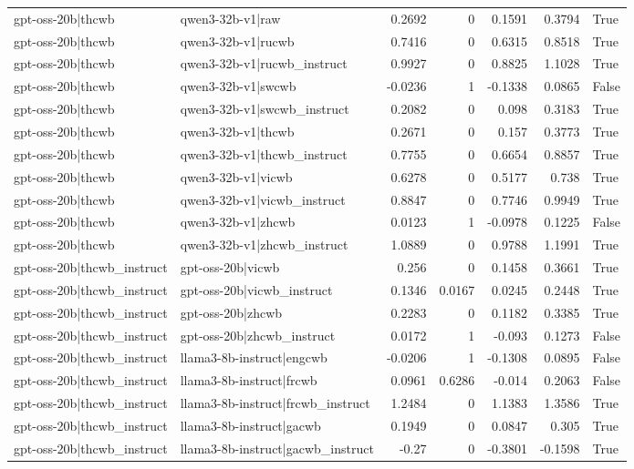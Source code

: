 \begin{table}
\begin{tabular}{l l r r r r l}
gpt-oss-20b|thcwb & qwen3-32b-v1|raw & 0.2692 & 0 & 0.1591 & 0.3794 & True \\
gpt-oss-20b|thcwb & qwen3-32b-v1|rucwb & 0.7416 & 0 & 0.6315 & 0.8518 & True \\
gpt-oss-20b|thcwb & qwen3-32b-v1|rucwb_instruct & 0.9927 & 0 & 0.8825 & 1.1028 & True \\
gpt-oss-20b|thcwb & qwen3-32b-v1|swcwb & -0.0236 & 1 & -0.1338 & 0.0865 & False \\
gpt-oss-20b|thcwb & qwen3-32b-v1|swcwb_instruct & 0.2082 & 0 & 0.098 & 0.3183 & True \\
gpt-oss-20b|thcwb & qwen3-32b-v1|thcwb & 0.2671 & 0 & 0.157 & 0.3773 & True \\
gpt-oss-20b|thcwb & qwen3-32b-v1|thcwb_instruct & 0.7755 & 0 & 0.6654 & 0.8857 & True \\
gpt-oss-20b|thcwb & qwen3-32b-v1|vicwb & 0.6278 & 0 & 0.5177 & 0.738 & True \\
gpt-oss-20b|thcwb & qwen3-32b-v1|vicwb_instruct & 0.8847 & 0 & 0.7746 & 0.9949 & True \\
gpt-oss-20b|thcwb & qwen3-32b-v1|zhcwb & 0.0123 & 1 & -0.0978 & 0.1225 & False \\
gpt-oss-20b|thcwb & qwen3-32b-v1|zhcwb_instruct & 1.0889 & 0 & 0.9788 & 1.1991 & True \\
gpt-oss-20b|thcwb_instruct & gpt-oss-20b|vicwb & 0.256 & 0 & 0.1458 & 0.3661 & True \\
gpt-oss-20b|thcwb_instruct & gpt-oss-20b|vicwb_instruct & 0.1346 & 0.0167 & 0.0245 & 0.2448 & True \\
gpt-oss-20b|thcwb_instruct & gpt-oss-20b|zhcwb & 0.2283 & 0 & 0.1182 & 0.3385 & True \\
gpt-oss-20b|thcwb_instruct & gpt-oss-20b|zhcwb_instruct & 0.0172 & 1 & -0.093 & 0.1273 & False \\
gpt-oss-20b|thcwb_instruct & llama3-8b-instruct|engcwb & -0.0206 & 1 & -0.1308 & 0.0895 & False \\
gpt-oss-20b|thcwb_instruct & llama3-8b-instruct|frcwb & 0.0961 & 0.6286 & -0.014 & 0.2063 & False \\
gpt-oss-20b|thcwb_instruct & llama3-8b-instruct|frcwb_instruct & 1.2484 & 0 & 1.1383 & 1.3586 & True \\
gpt-oss-20b|thcwb_instruct & llama3-8b-instruct|gacwb & 0.1949 & 0 & 0.0847 & 0.305 & True \\
gpt-oss-20b|thcwb_instruct & llama3-8b-instruct|gacwb_instruct & -0.27 & 0 & -0.3801 & -0.1598 & True \\

\end{tabular}
\end{table}
